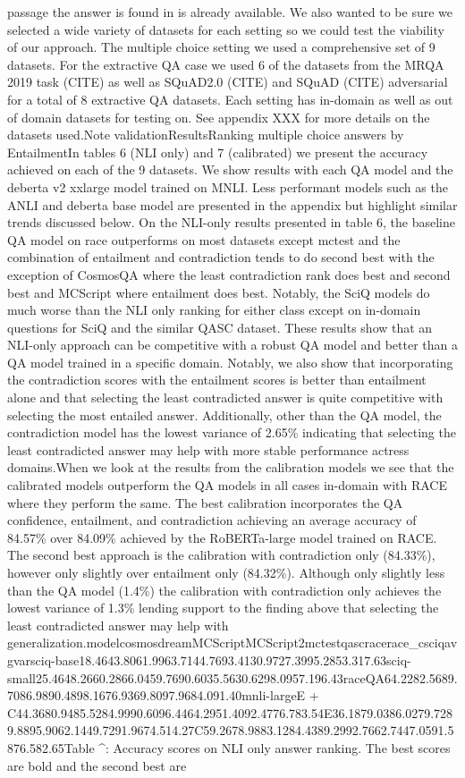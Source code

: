 \documentclass{scrbook}
\begin{document}
passage the answer is found in is already available. We also wanted to be sure we selected a wide variety of datasets for each setting so we could test the viability of our approach. The multiple choice setting we used a comprehensive set of 9 datasets. For the extractive QA case we used 6 of the datasets from the MRQA 2019 task (CITE) as well as SQuAD2.0 (CITE) and SQuAD (CITE) adversarial for a total of 8 extractive QA datasets. Each setting has in-domain as well as out of domain datasets for testing on. See appendix XXX for more details on the datasets used.Note validationResultsRanking multiple choice answers by EntailmentIn tables 6 (NLI only) and 7 (calibrated) we present the accuracy achieved on each of the 9 datasets. We show results with each QA model and the deberta v2 xxlarge model trained on MNLI. Less performant models such as the ANLI and deberta base model are presented in the appendix but highlight similar trends discussed below. On the NLI-only results presented in table 6, the baseline QA model on race outperforms on most datasets except mctest and the combination of entailment and contradiction tends to do second best with the exception of CosmosQA where the least contradiction rank does best and second best and MCScript where entailment does best. Notably, the SciQ models do much worse than the NLI only ranking for either class except on in-domain questions for SciQ and the similar QASC dataset. These results show that an NLI-only approach can be competitive with a robust QA model and better than a QA model trained in a specific domain. Notably, we also show that incorporating the contradiction scores with the entailment scores is better than entailment alone and that selecting the least contradicted answer is quite competitive with selecting the most entailed answer. Additionally, other than the QA model, the contradiction model has the lowest variance of 2.65\% indicating that selecting the least contradicted answer may help with more stable performance actress domains.When we look at the results from the calibration models we see that the calibrated models outperform the QA models in all cases in-domain with RACE where they perform the same. The best calibration incorporates the QA confidence, entailment, and contradiction achieving an average accuracy of 84.57\% over 84.09\% achieved by the RoBERTa-large model trained on RACE. The second best approach is the calibration with contradiction only (84.33\%), however only slightly over entailment only (84.32\%). Although only slightly less than the QA model (1.4\%) the calibration with contradiction only achieves the lowest variance of 1.3\% lending support to the finding above that selecting the least contradicted answer may help with generalization.modelcosmosdreamMCScriptMCScript2mctestqascracerace\_csciqavgvarsciq-base18.4643.8061.9963.7144.7693.4130.9727.3995.2853.317.63sciq-small25.4648.2660.2866.0459.7690.6035.5630.6298.0957.196.43raceQA64.2282.5689.7086.9890.4898.1676.9369.8097.9684.091.40mnli-largeE + C44.3680.9485.5284.9990.6096.4464.2951.4092.4776.783.54E36.1879.0386.0279.7289.8895.9062.1449.7291.9674.514.27C59.2678.9883.1284.4389.2992.7662.7447.0591.5876.582.65Table \textasciicircum{}: Accuracy scores on NLI only answer ranking. The best scores are bold and the second best are 
\end{document}
